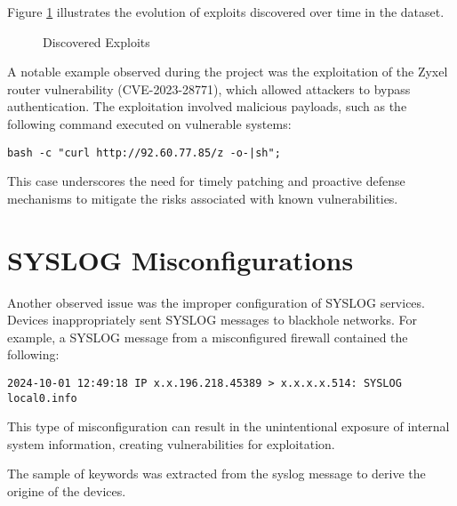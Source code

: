 Figure \ref{countedexploits} illustrates the evolution of exploits discovered over time in the dataset.

\begin{figure}
    
    \caption{Discovered Exploits}
    \label{countedexploits}
\end{figure}


A notable example observed during the project was the exploitation of the Zyxel router vulnerability (CVE-2023-28771), which allowed attackers to bypass authentication. The exploitation involved malicious payloads, such as the following command executed on vulnerable systems:
\begin{verbatim}
bash -c "curl http://92.60.77.85/z -o-|sh";
\end{verbatim}
This case underscores the need for timely patching and proactive defense mechanisms to mitigate the risks associated with known vulnerabilities.

\section{SYSLOG Misconfigurations}
Another observed issue was the improper configuration of SYSLOG services. Devices inappropriately sent SYSLOG messages to blackhole networks. For example, a SYSLOG message from a misconfigured firewall contained the following:
\begin{verbatim}
2024-10-01 12:49:18 IP x.x.196.218.45389 > x.x.x.x.514: SYSLOG local0.info
\end{verbatim}
This type of misconfiguration can result in the unintentional exposure of internal system information, creating vulnerabilities for exploitation.

The sample of keywords was extracted from the syslog message to derive the origine of the devices.

